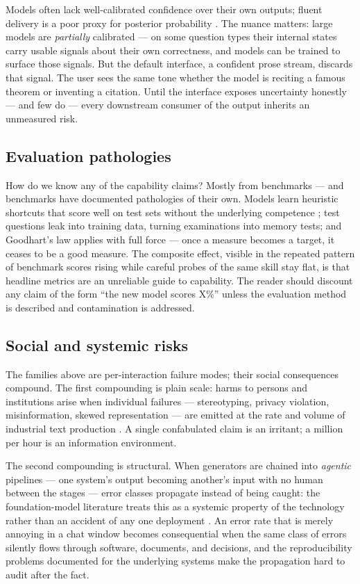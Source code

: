 \documentclass[11pt,a4paper]{article}
\begin{document}
Models often lack well-calibrated confidence over their own outputs; fluent
delivery is a poor proxy for posterior probability
\autocite{kadavath2022language}. The nuance matters: large models are
\emph{partially} calibrated --- on some question types their internal states
carry usable signals about their own correctness, and models can be trained
to surface those signals. But the default interface, a confident prose
stream, discards that signal. The user sees the same tone whether the model
is reciting a famous theorem or inventing a citation. Until the interface
exposes uncertainty honestly --- and few do --- every downstream consumer of
the output inherits an unmeasured risk.

\subsection{Evaluation pathologies}
\label{sec:evaluation}

How do we know any of the capability claims? Mostly from benchmarks --- and
benchmarks have documented pathologies of their own. Models learn heuristic
shortcuts that score well on test sets without the underlying competence
\autocite{mccoy2019right}; test questions leak into training data, turning
examinations into memory tests; and Goodhart's law applies with full force
--- once a measure becomes a target, it ceases to be a good measure. The
composite effect, visible in the repeated pattern of benchmark scores rising
while careful probes of the same skill stay flat, is that headline metrics
are an unreliable guide to capability. The reader should discount any claim
of the form ``the new model scores X\%'' unless the evaluation method is
described and contamination is addressed.

\subsection{Social and systemic risks}
\label{sec:social}

The families above are per-interaction failure modes; their social
consequences compound. The first compounding is plain scale: harms to
persons and institutions arise when individual failures --- stereotyping,
privacy violation, misinformation, skewed representation --- are emitted at
the rate and volume of industrial text production
\autocite{weidinger2021ethical}. A single confabulated claim is an
irritant; a million per hour is an information environment.

The second compounding is structural. When generators are chained into
\emph{agentic} pipelines --- one system's output becoming another's input
with no human between the stages --- error classes propagate instead of
being caught: the foundation-model literature treats this as a systemic
property of the technology rather than an accident of any one deployment
\autocite{bommasani2021opportunities}. An error rate that is merely annoying
in a chat window becomes consequential when the same class of errors
silently flows through software, documents, and decisions, and the
reproducibility problems documented for the underlying systems
\autocite{kapoor2023leakage} make the propagation hard to audit after the
fact.
\end{document}
